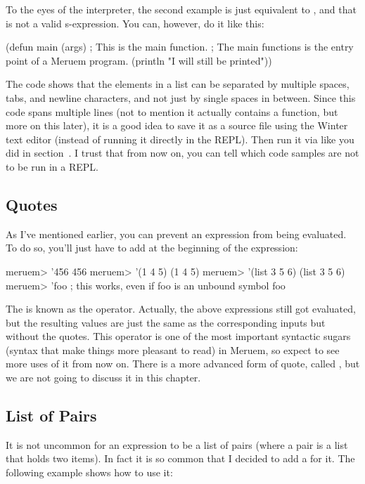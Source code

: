To the eyes of the interpreter, the second example is just equivalent to , and that is not a valid s-expression. You can, however, do it like this:

\begin{Meruem}
(defun main (args)    ; This is the main function.
  ; The main functions is the entry point of a Meruem program.
  (println "I will still be printed"))
\end{Meruem}

The code shows that the elements in a list can be separated by multiple spaces, tabs, and newline characters, and not just by single spaces in between. Since this code spans multiple lines (not to mention it actually contains a  function, but more on this later), it is a good idea to save it as a source file using the Winter text editor (instead of running it directly in the REPL). Then run it via  like you did in section~. I trust that from now on, you can tell which code samples are not to be run in a REPL. 

\subsection{Quotes}
As I've mentioned earlier, you can prevent an expression from being evaluated. To do so, you'll just have to add  at the beginning of the expression:

\begin{REPL}
meruem> '456
456
meruem> '(1 4 5)
(1 4 5)
meruem> '(list 3 5 6)
(list 3 5 6)
meruem> 'foo  ; this works, even if foo is an unbound symbol
foo
\end{REPL}

The  is known as the  operator. Actually, the above expressions still got evaluated, but the resulting values are just the same as the corresponding inputs but without the quotes. This operator is one of the most important syntactic sugars (syntax that make things more pleasant to read) in Meruem, so expect to see more uses of it from now on. There is a more advanced form of quote, called , but we are not going to discuss it in this chapter.

\subsection{List of Pairs}
\label{sec:list-of-pairs}
It is not uncommon for an expression to be a list of pairs (where a pair is a list that holds two items). In fact it is so common that I decided to add a  for it. The following example shows how to use it:

